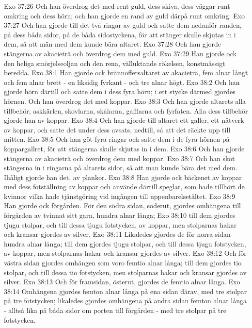Exo 37:26  Och han överdrog det med rent guld, dess skiva, dess väggar runt omkring och dess hörn; och han gjorde en rand av guld därpå runt omkring.
Exo 37:27  Och han gjorde till det två ringar av guld och satte dem nedanför randen, på dess båda sidor, på de båda sidostyckena, för att stänger skulle skjutas in i dem, så att män med dem kunde bära altaret.
Exo 37:28  Och han gjorde stängerna av akacieträ och överdrog dem med guld.
Exo 37:29  Han gjorde ock den heliga smörjelseoljan och den rena, välluktande rökelsen, konstmässigt beredda.
Exo 38:1  Han gjorde ock brännoffersaltaret av akacieträ, fem alnar långt och fem alnar brett - en liksidig fyrkant - och tre alnar högt.
Exo 38:2  Och han gjorde hörn därtill och satte dem i dess fyra hörn; i ett stycke därmed gjordes hörnen. Och han överdrog det med koppar.
Exo 38:3  Och han gjorde altarets alla tillbehör, askkärlen, skovlarna, skålarna, gafflarna och fyrfaten. Alla dess tillbehör gjorde han av koppar.
Exo 38:4  Och han gjorde till altaret ett galler, ett nätverk av koppar, och satte det under dess avsats, nedtill, så att det räckte upp till mitten.
Exo 38:5  Och han göt fyra ringar och satte dem i de fyra hörnen på koppargallret, för att stängerna skulle skjutas in i dem.
Exo 38:6  Och han gjorde stängerna av akacieträ och överdrog dem med koppar.
Exo 38:7  Och han sköt stängerna in i ringarna på altarets sidor, så att man kunde bära det med dem. Ihåligt gjorde han det, av plankor.
Exo 38:8  Han gjorde ock bäckenet av koppar med dess fotställning av koppar och använde därtill speglar, som hade tillhört de kvinnor vilka hade tjänstgöring vid ingången till uppenbarelsetältet.
Exo 38:9  Han gjorde ock förgården. För den södra sidan, söderut, gjordes omhängena till förgården av tvinnat sitt garn, hundra alnar långa;
Exo 38:10  till dem gjordes tjugu stolpar, och till dessa tjugu fotstycken, av koppar, men stolparnas hakar och kransar gjordes av silver.
Exo 38:11  Likaledes gjordes de för norra sidan hundra alnar långa; till dem gjordes tjugu stolpar, och till dessa tjugu fotstycken, av koppar, men stolparnas hakar och kransar gjordes av silver.
Exo 38:12  Och för västra sidan gjordes omhängen som voro femtio alnar långa; till dem gjordes tio stolpar, och till dessa tio fotstycken, men stolparnas hakar och kransar gjordes av silver.
Exo 38:13  Och för framsidan, österut, gjordes de femtio alnar långa.
Exo 38:14  Omhängena gjordes femton alnar långa på ena sidan därav, med tre stolpar på tre fotstycken; likaledes gjordes omhängena på andra sidan femton alnar långa - alltså lika på båda sidor om porten till förgården - med tre stolpar på tre fotstycken.
